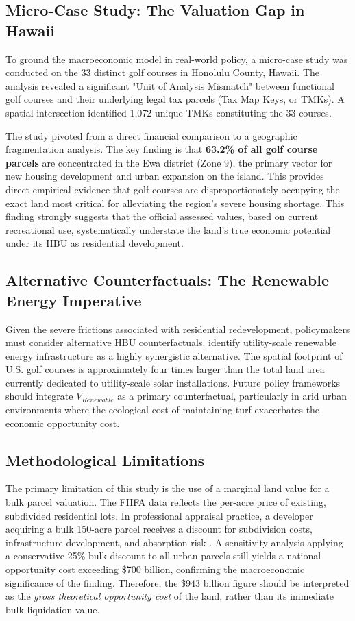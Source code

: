 \documentclass[10pt, letterpaper]{article}
\begin{document}
\subsection{Micro-Case Study: The Valuation Gap in Hawaii}
To ground the macroeconomic model in real-world policy, a micro-case study was conducted on the 33 distinct golf courses in Honolulu County, Hawaii. The analysis revealed a significant "Unit of Analysis Mismatch" between functional golf courses and their underlying legal tax parcels (Tax Map Keys, or TMKs). A spatial intersection identified 1,072 unique TMKs constituting the 33 courses.

The study pivoted from a direct financial comparison to a geographic fragmentation analysis. The key finding is that \textbf{63.2\% of all golf course parcels} are concentrated in the Ewa district (Zone 9), the primary vector for new housing development and urban expansion on the island. This provides direct empirical evidence that golf courses are disproportionately occupying the exact land most critical for alleviating the region's severe housing shortage. This finding strongly suggests that the official assessed values, based on current recreational use, systematically understate the land's true economic potential under its HBU as residential development.

\subsection{Alternative Counterfactuals: The Renewable Energy Imperative}
Given the severe frictions associated with residential redevelopment, policymakers must consider alternative HBU counterfactuals. \textcite{Weinand2025} identify utility-scale renewable energy infrastructure as a highly synergistic alternative. The spatial footprint of U.S. golf courses is approximately four times larger than the total land area currently dedicated to utility-scale solar installations. Future policy frameworks should integrate $V_{Renewable}$ as a primary counterfactual, particularly in arid urban environments where the ecological cost of maintaining turf exacerbates the economic opportunity cost.

\subsection{Methodological Limitations}
The primary limitation of this study is the use of a marginal land value for a bulk parcel valuation. The FHFA data reflects the per-acre price of existing, subdivided residential lots. In professional appraisal practice, a developer acquiring a bulk 150-acre parcel receives a discount for subdivision costs, infrastructure development, and absorption risk \parencite{AppraisalInstitute2020}. A sensitivity analysis applying a conservative 25\% bulk discount to all urban parcels still yields a national opportunity cost exceeding \$700 billion, confirming the macroeconomic significance of the finding. Therefore, the \$943 billion figure should be interpreted as the \textit{gross theoretical opportunity cost} of the land, rather than its immediate bulk liquidation value.
\end{document}
